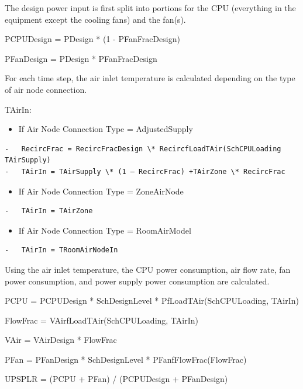 The design power input is first split into portions for the CPU (everything in the equipment except the cooling fans) and the fan(s).

PCPUDesign = PDesign * (1 - PFanFracDesign)

PFanDesign = PDesign * PFanFracDesign

For each time step, the air inlet temperature is calculated depending on the type of air node connection.

TAirIn:

\begin{itemize}
\tightlist
\item
  If Air Node Connection Type = AdjustedSupply
\end{itemize}

\begin{lstlisting}
-   RecircFrac = RecircFracDesign \* RecircfLoadTAir(SchCPULoading TAirSupply)
-   TAirIn = TAirSupply \* (1 – RecircFrac) +TAirZone \* RecircFrac
\end{lstlisting}

\begin{itemize}
\tightlist
\item
  If Air Node Connection Type = ZoneAirNode
\end{itemize}

\begin{lstlisting}
-   TAirIn = TAirZone
\end{lstlisting}

\begin{itemize}
\tightlist
\item
  If Air Node Connection Type = RoomAirModel
\end{itemize}

\begin{lstlisting}
-   TAirIn = TRoomAirNodeIn
\end{lstlisting}

Using the air inlet temperature, the CPU power consumption, air flow rate, fan power consumption, and power supply power consumption are calculated.

PCPU = PCPUDesign * SchDesignLevel * PfLoadTAir(SchCPULoading, TAirIn)

FlowFrac = VAirfLoadTAir(SchCPULoading, TAirIn)

VAir = VAirDesign * FlowFrac

PFan = PFanDesign * SchDesignLevel * PFanfFlowFrac(FlowFrac)

UPSPLR = (PCPU + PFan) / (PCPUDesign + PFanDesign)


